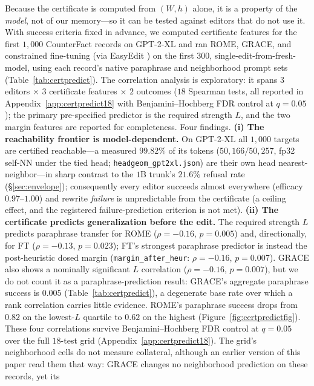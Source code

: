 \documentclass[11pt]{article}
\theoremstyle{remark}
\begin{document}
Because the certificate is computed from $(W,h)$ alone, it is a property of the
\emph{model}, not of our memory---so it can be tested against editors that do not
use it. With success criteria fixed in advance, we computed certificate features
for the first $1{,}000$ CounterFact records \citep{meng2022rome} on GPT-2-XL and
ran ROME, GRACE, and constrained fine-tuning (via EasyEdit
\citep{wang2023easyedit}) on the first $300$, single-edit-from-fresh-model, using
each record's native paraphrase and neighborhood prompt sets
(Table~\ref{tab:certpredict}). The correlation analysis is exploratory: it spans
$3$ editors $\times$ $3$ certificate features $\times$ $2$ outcomes ($18$
Spearman tests, all reported in Appendix~\ref{app:certpredict18} with
Benjamini--Hochberg FDR control at $q=0.05$); the primary pre-specified
predictor is the required strength $L$, and the two margin features are
reported for completeness. Four findings.
\textbf{(i) The reachability frontier is model-dependent.} On GPT-2-XL all
$1{,}000$ targets are certified reachable---a measured $99.82\%$ of its tokens
($50{,}166/50{,}257$, fp32 self-NN under the tied head;
\texttt{headgeom\_gpt2xl.json}) are their own
head nearest-neighbor---in sharp contrast to the $1$B trunk's $21.6\%$ refusal
rate (\S\ref{sec:envelope}); consequently every editor succeeds almost everywhere
(efficacy $0.97$--$1.00$) and rewrite \emph{failure} is unpredictable from the
certificate (a ceiling effect, and the registered failure-prediction criterion is
not met).
\textbf{(ii) The certificate predicts generalization before the edit.} The
required strength $L$ predicts paraphrase transfer for ROME
($\rho=-0.16$, $p=0.005$) and, directionally, for FT ($\rho=-0.13$, $p=0.023$);
FT's strongest paraphrase predictor is instead the post-heuristic dosed margin
(\texttt{margin\_after\_heur}: $\rho=-0.16$, $p=0.007$). GRACE also shows a
nominally significant $L$ correlation ($\rho=-0.16$, $p=0.007$), but we do not
count it as a paraphrase-prediction result: GRACE's aggregate paraphrase
success is $0.005$ (Table~\ref{tab:certpredict}), a degenerate base rate over
which a rank correlation carries little evidence. ROME's paraphrase success
drops from $0.82$ on the lowest-$L$ quartile to $0.62$ on the highest
(Figure~\ref{fig:certpredictfig}). These four correlations survive
Benjamini--Hochberg FDR control at $q=0.05$ over the full $18$-test grid
(Appendix~\ref{app:certpredict18}). The grid's neighborhood cells do not
measure collateral, although an earlier version of this paper read them that
way: GRACE changes no neighborhood prediction on these records, yet its
\end{document}
